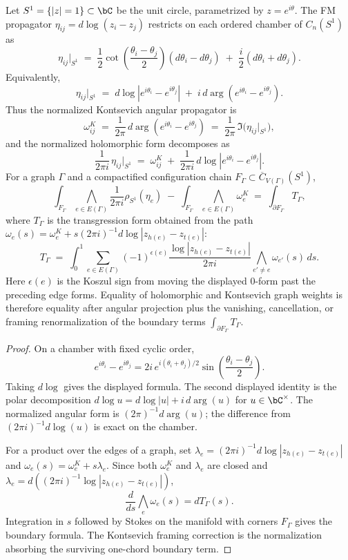 \begin{proposition}
\label{prop:propagator-restriction}
Let $S^1 = \{|z| = 1\} \subset \bC$ be the unit circle, parametrized
by $z = e^{i\theta}$. The FM propagator $\eta_{ij} = d\log(z_i-z_j)$
restricts on each ordered chamber of $C_n(S^1)$ as
\[
\eta_{ij}\big|_{S^1}
\;=\;
\frac12\cot\!\left(\frac{\theta_i-\theta_j}{2}\right)
(d\theta_i-d\theta_j)
\;+\;
\frac{i}{2}(d\theta_i+d\theta_j).
\]
Equivalently,
\[
\eta_{ij}\big|_{S^1}
\;=\;
d\log|e^{i\theta_i}-e^{i\theta_j}|
\;+\;
i\,d\arg(e^{i\theta_i}-e^{i\theta_j}).
\]
Thus the normalized Kontsevich angular propagator is
\[
\omega^K_{ij}
\;=\;
\frac{1}{2\pi}\,d\arg(e^{i\theta_i}-e^{i\theta_j})
\;=\;
\frac{1}{2\pi}\,\Im\big(\eta_{ij}\big|_{S^1}\big),
\]
and the normalized holomorphic form decomposes as
\[
\frac{1}{2\pi i}\,\eta_{ij}\big|_{S^1}
\;=\;
\omega^K_{ij}
\;+\;
\frac{1}{2\pi i}\,d\log|e^{i\theta_i}-e^{i\theta_j}|.
\]
For a graph $\Gamma$ and a compactified configuration chain
$F_\Gamma\subset\overline{C}_{V(\Gamma)}(S^1)$,
\[
\int_{F_\Gamma}\bigwedge_{e\in E(\Gamma)}
\frac{1}{2\pi i}\rho_{S^1}(\eta_e)
\;-\;
\int_{F_\Gamma}\bigwedge_{e\in E(\Gamma)}\omega^K_e
\;=\;
\int_{\partial F_\Gamma} T_\Gamma ,
\]
where $T_\Gamma$ is the transgression form obtained from the path
$\omega_e(s)=\omega^K_e+s(2\pi i)^{-1}d\log|z_{h(e)}-z_{t(e)}|$:
\[
T_\Gamma
\;=\;
\int_0^1\sum_{e\in E(\Gamma)}
(-1)^{\epsilon(e)}
\frac{\log|z_{h(e)}-z_{t(e)}|}{2\pi i}
\bigwedge_{e'\neq e}\omega_{e'}(s)\,ds .
\]
Here $\epsilon(e)$ is the Koszul sign from moving the displayed
$0$-form past the preceding edge forms.  Equality of holomorphic and
Kontsevich graph weights is therefore equality after angular
projection plus the vanishing, cancellation, or framing
renormalization of the boundary terms $\int_{\partial F_\Gamma}T_\Gamma$.
\end{proposition}

\begin{proof}
On a chamber with fixed cyclic order,
\[
e^{i\theta_i}-e^{i\theta_j}
=2i\,e^{i(\theta_i+\theta_j)/2}
\sin\!\left(\frac{\theta_i-\theta_j}{2}\right).
\]
Taking $d\log$ gives the displayed formula. The second displayed identity is
the polar decomposition $d\log u=d\log|u|+i\,d\arg(u)$ for $u\in\bC^\times$.
The normalized angular form is $(2\pi)^{-1}d\arg(u)$; the difference from
$(2\pi i)^{-1}d\log(u)$ is exact on the chamber.

For a product over the edges of a graph, set
$\lambda_e=(2\pi i)^{-1}d\log|z_{h(e)}-z_{t(e)}|$ and
$\omega_e(s)=\omega^K_e+s\lambda_e$. Since both $\omega^K_e$ and $\lambda_e$
are closed and $\lambda_e=d((2\pi i)^{-1}\log|z_{h(e)}-z_{t(e)}|)$,
\[
\frac{d}{ds}\bigwedge_e\omega_e(s)=dT_\Gamma(s).
\]
Integration in $s$ followed by Stokes on the manifold with corners $F_\Gamma$
gives the boundary formula. The Kontsevich framing correction is the
normalization absorbing the surviving one-chord boundary term.
\end{proof}

